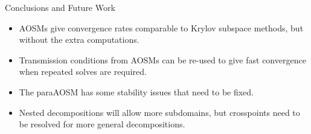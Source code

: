 \documentclass{beamer}
\begin{document}
\begin{frame}{Conclusions and Future Work}
\begin{itemize}
\item AOSMs give convergence rates comparable to Krylov subspace methods, but without the extra computations.
\item Transmission conditions from AOSMs can be re-used to give fast convergence when repeated solves are required.
\item The paraAOSM has some stability issues that need to be fixed.
\item Nested decompositions will allow more subdomains, but crosspoints need to be resolved for more general decompositions.
\end{itemize}
\end{frame}
\end{document}
